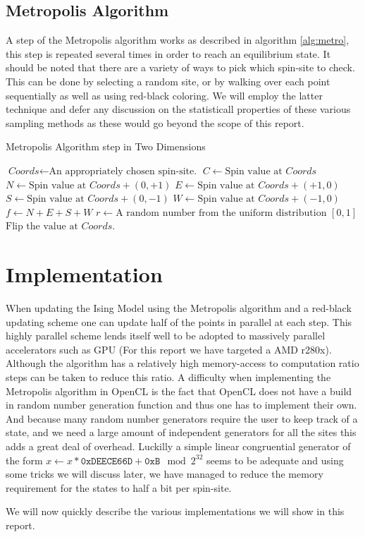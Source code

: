 \subsection{Metropolis Algorithm}
A step of the Metropolis algorithm works as described in algorithm \ref{alg:metro}, this step is repeated several times in order to reach an equilibrium state.
It should be noted that there are a variety of ways to pick which spin-site to check. This can be done by selecting a random site, or by walking over each point sequentially as well as using red-black coloring.
We will employ the latter technique and defer any discussion on the statisticall properties of these various sampling methods as these would go beyond the scope of this report.
\begin{algorithm}
  \caption{Metropolis Algorithm step in Two Dimensions}\label{alg:metro}
  \begin{algorithmic}[1]
    \State $\textit{Coords} \gets \text{An appropriately chosen spin-site.}$
    \State $\textit{C} \gets \text{Spin value at }Coords$
    \State $\textit{N} \gets \text{Spin value at }Coords + (0, +1)$
    \State $\textit{E} \gets \text{Spin value at }Coords + (+1, 0)$
    \State $\textit{S} \gets \text{Spin value at }Coords + (0, -1)$
    \State $\textit{W} \gets \text{Spin value at }Coords + (-1, 0)$
    \State $\textit{f} \gets N+E+S+W$
    \State $\textit{r} \gets \text{A random number from the uniform distribution } \left[0,1\right]$
      \State $\text{Flip the value at }Coords.$
    \EndIf
  \end{algorithmic}
\end{algorithm}


\section{Implementation}
When updating the Ising Model using the Metropolis algorithm and a red-black updating scheme one can update half of the points in parallel at each step.
This highly parallel scheme lends itself well to be adopted to massively parallel accelerators such as GPU (For this report we have targeted a AMD r280x).
Although the algorithm has a relatively high memory-access to computation ratio steps can be taken to reduce this ratio. A difficulty when implementing the Metropolis
algorithm in OpenCL is the fact that OpenCL does not have a build in random number generation function and thus one has to implement their own. And because many random number generators
require the user to keep track of a state, and we need a large amount of independent generators for all the sites this adds a great deal of overhead. Luckilly a simple linear congruential generator of the form
$x \gets x * \texttt{0xDEECE66D} + \texttt{0xB} \mod 2^{32}$ seems to be adequate and using some tricks we will discuss later, we have managed to reduce the memory requirement for the states to half a bit per spin-site.
\par We will now quickly describe the various implementations we will show in this report.

